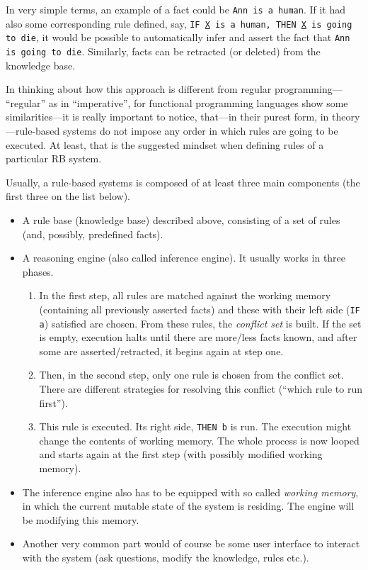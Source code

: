 In very simple terms, an example of a fact could be \texttt{Ann is a human}. If it had also some corresponding rule defined, say, \texttt{IF \underline{X} is a human, THEN \underline{X} is going to die}, it would be possible to automatically infer and assert the fact that \texttt{Ann is going to die}. Similarly, facts can be retracted (or deleted) from the knowledge base.

In thinking about how this approach is different from regular programming--- ``regular'' as in ``imperative'', for functional programming languages show some similarities---it is really important to notice, that---in their purest form, in theory---rule-based systems do not impose any order in which rules are going to be executed. At least, that is the suggested mindset when defining rules of a particular RB system.

Usually, a rule-based systems is composed of at least three main components (the first three on the list below).

\begin{itemize}
	\item A rule base (knowledge base) described above, consisting of a set of rules (and, possibly, predefined facts).
	\item A reasoning engine (also called inference engine). It usually works in three phases. \begin{enumerate}
		\item In the first step, all rules are matched against the working memory (containing all previously asserted facts) and these with their left side (\texttt{IF a}) satisfied are chosen. From these rules, the \emph{conflict set} is built. If the set is empty, execution halts until there are more/less facts known, and after some are asserted/retracted, it begins again at step one.
		\item Then, in the second step, only one rule is chosen from the conflict set. There are different strategies for resolving this conflict (``which rule to run first'').
		\item This rule is executed. Its right side, \texttt{THEN b} is run. The execution might change the contents of working memory. The whole process is now looped and starts again at the first step (with possibly modified working memory).
	\end{enumerate}
	\item The inference engine also has to be equipped with so called \emph{working memory}, in which the current mutable state of the system is residing. The engine will be modifying this memory.
	\item Another very common part would of course be some user interface to interact with the system (ask questions, modify the knowledge, rules etc.).
\end{itemize}

